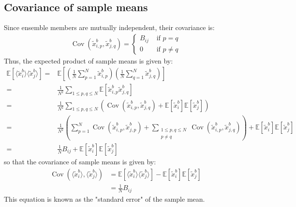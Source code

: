\documentclass[12pt]{scrartcl}
\DeclareMathOperator{\Cov}{Cov}
\begin{document}
\subsection{Covariance of sample means}
Since ensemble members are mutually independent, their covariance is:
\begin{align}
\Cov \left(\widetilde{x}^b_{i,p},\widetilde{x}^b_{j,q}\right) = \left\{
\begin{array}{cl}
B_{ij} & \text{ if }p=q \\
0 & \text{ if }p \ne q
\end{array}
\right.
\end{align}
Thus, the expected product of sample means is given by:
\begin{align}
\mathbb{E} \left[\langle \widetilde{x}^b_i \rangle \langle \widetilde{x}^b_j \rangle\right] = & \mathbb{E} \left[\left(\frac{1}{N} \sum_{p=1}^N \widetilde{x}^b_{i,p} \right) \left(\frac{1}{N} \sum_{q=1}^N \widetilde{x}^b_{j,q}\right)\right] \nonumber \\
= \ & \frac{1}{N^2} \sum_{1 \le p,q \le N} \mathbb{E} \left[\widetilde{x}^b_{i,p} \widetilde{x}^b_{j,q}\right] \nonumber \\
= \ & \frac{1}{N^2} \sum_{1 \le p,q \le N} \left(\Cov \left(\widetilde{x}^b_{i,p},\widetilde{x}^b_{j,q}\right)+\mathbb{E} \left[\widetilde{x}^b_i\right] \mathbb{E} \left[\widetilde{x}^b_j\right]\right) \nonumber \\
= \ & \frac{1}{N^2} \left(\sum_{p=1}^N \Cov \left(\widetilde{x}^b_{i,p},\widetilde{x}^b_{j,p}\right) + \sum_{\substack{1 \le p,q \le N\\p \ne q}} \Cov \left(\widetilde{x}^b_{i,p},\widetilde{x}^b_{j,q}\right) \right) + \mathbb{E} \left[\widetilde{x}^b_i\right] \mathbb{E} \left[\widetilde{x}^b_j\right] \nonumber \\
= \ & \frac{1}{N} B_{ij} + \mathbb{E} \left[\widetilde{x}^b_i\right] \mathbb{E} \left[\widetilde{x}^b_j\right]
\end{align}
so that the covariance of sample means is given by:
\begin{align}
\label{eq:cov_means}
\Cov \left(\langle \widetilde{x}^b_i \rangle,\langle \widetilde{x}^b_j \rangle\right) & = \mathbb{E} \left[\langle \widetilde{x}^b_i \rangle \langle \widetilde{x}^b_j \rangle\right] - \mathbb{E} \left[\widetilde{x}^b_i\right] \mathbb{E} \left[\widetilde{x}^b_j\right] \nonumber \\
& = \frac{1}{N} B_{ij}
\end{align}
This equation is known as the "standard error" of the sample mean.
\end{document}
